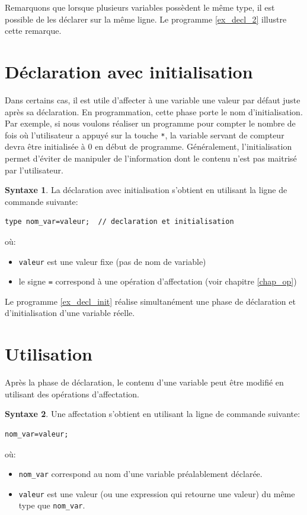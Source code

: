 \documentclass[a4paper,11pt]{book}
\theoremstyle{definition}
\newtheorem*{syntaxe}{Syntaxe}
\begin{document}
Remarquons que lorsque plusieurs variables possèdent le même type,
il est possible de les déclarer sur la même ligne. Le programme
\ref{ex_decl_2} illustre cette remarque.



\section{Déclaration avec initialisation}
Dans certains cas, il est utile d'affecter à une variable une valeur par défaut juste après sa déclaration. En programmation, cette phase porte le nom d'initialisation. Par exemple, si nous voulons réaliser un programme pour compter le nombre de fois où l'utilisateur a appuyé sur la touche \texttt{*}, la variable servant de compteur devra être initialisée à 0 en début de programme. Généralement, l'initialisation permet d'éviter de manipuler de l'information dont le contenu n'est pas maitrisé par l'utilisateur.
\begin{syntaxe}La déclaration avec initialisation s'obtient en utilisant la ligne de commande suivante:
\begin{lstlisting}
type nom_var=valeur;  // declaration et initialisation
\end{lstlisting}
où:
\begin{itemize}
\item \texttt{valeur} est une valeur fixe (pas de nom de variable)
\item le signe \texttt{=} correspond à une opération d'affectation (voir chapitre \ref{chap_op}) 
\end{itemize}
\end{syntaxe}
Le programme \ref{ex_decl_init} réalise simultanément une phase de déclaration et d'initialisation d'une variable réelle.



\section{Utilisation}

Après la phase de déclaration, le contenu d'une variable peut être modifié en utilisant des opérations d'affectation.
\begin{syntaxe}Une affectation s'obtient en utilisant la ligne de commande suivante:
\begin{lstlisting}
nom_var=valeur; 
\end{lstlisting}
où:
\begin{itemize}
\item \texttt{nom\_var} correspond au nom d'une variable préalablement déclarée.
\item \texttt{valeur} est une valeur (ou une expression qui retourne une valeur) du même type que \texttt{nom\_var}.
\end{itemize}
\end{syntaxe}
\end{document}
